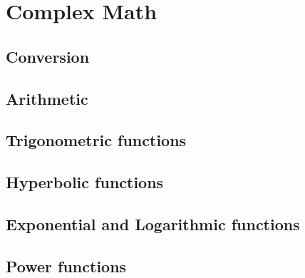 % 
%
\section{Complex Math}
\label{section:fpm:math-complex}

\subsection{Conversion}
\label{section:fpm:math-complex:conversion}

\subsection{Arithmetic}
\label{section:fpm:math-complex:arithmetic}

\subsection{Trigonometric functions}
\label{section:fpm:math-complex:trig}

\subsection{Hyperbolic functions}
\label{section:fpm:math-complex:hyperbolic}

\subsection{Exponential and Logarithmic functions}
\label{section:fpm:math-complex:explog}

\subsection{Power functions}
\label{section:fpm:math-complex:power}


